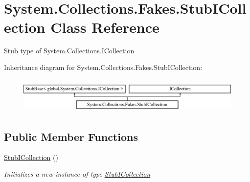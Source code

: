 \hypertarget{class_system_1_1_collections_1_1_fakes_1_1_stub_i_collection}{\section{System.\-Collections.\-Fakes.\-Stub\-I\-Collection Class Reference}
\label{class_system_1_1_collections_1_1_fakes_1_1_stub_i_collection}
}


Stub type of System.\-Collections.\-I\-Collection 


Inheritance diagram for System.\-Collections.\-Fakes.\-Stub\-I\-Collection\-:\begin{figure}[H]
\begin{center}
\leavevmode
\includegraphics[height=1.842105cm]{class_system_1_1_collections_1_1_fakes_1_1_stub_i_collection}
\end{center}
\end{figure}
\subsection*{Public Member Functions}
\begin{DoxyCompactItemize}
\item 
\hyperlink{class_system_1_1_collections_1_1_fakes_1_1_stub_i_collection_a57262b20007fc64638a95e6ae444d9b9}{Stub\-I\-Collection} ()
\begin{DoxyCompactList}\small\item\em Initializes a new instance of type \hyperlink{class_system_1_1_collections_1_1_fakes_1_1_stub_i_collection}{Stub\-I\-Collection}\end{DoxyCompactList}\end{DoxyCompactItemize}

